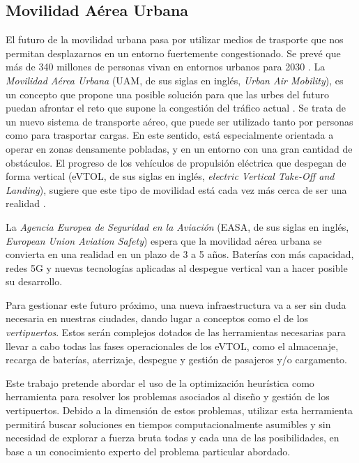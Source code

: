 \documentclass[12pt,a4paper]{book}
\begin{document}
\subsection{Movilidad Aérea Urbana} \label{Subsubsec: 1_2_1}
El futuro de la movilidad urbana pasa por utilizar medios de trasporte que nos permitan desplazarnos en un entorno fuertemente congestionado. Se prevé que más de 340 millones de personas vivan en entornos urbanos para 2030 \cite{easa_what_nodate}. La \textsl{Movilidad Aérea Urbana} (UAM, de sus siglas en inglés, \textsl{Urban Air Mobility}), es un concepto que propone una posible solución para que las urbes del futuro puedan afrontar el reto que supone la congestión del tráfico actual \cite{park_vertiport_2022}. Se trata de un nuevo sistema de transporte aéreo, que puede ser utilizado tanto por personas como para trasportar cargas. En este sentido, está especialmente orientada a operar en zonas densamente pobladas, y en un entorno con una gran cantidad de obstáculos. El progreso de los vehículos de propulsión eléctrica que despegan de forma vertical (eVTOL, de sus siglas en inglés, \textsl{electric Vertical Take-Off and Landing}), sugiere que este tipo de movilidad está cada vez más cerca de ser una realidad \cite{espejo-diaz_heuristic_2023}.  

La \textsl{Agencia Europea de Seguridad en la Aviación} (EASA, de sus siglas en inglés, \textsl{European Union Aviation Safety}) espera que la movilidad aérea urbana se convierta en una realidad en un plazo de 3 a 5 años. Baterías con más capacidad, redes 5G y nuevas tecnologías aplicadas al despegue vertical van a hacer posible su desarrollo.

Para gestionar este futuro próximo, una nueva infraestructura va a ser sin duda necesaria en nuestras ciudades, dando lugar a conceptos como el de los 
\textsl{vertipuertos}. Estos serán complejos dotados de las herramientas necesarias para llevar a cabo todas las fases operacionales de los eVTOL, como el almacenaje, recarga de baterías, aterrizaje, despegue y gestión de pasajeros y/o cargamento. 

Este trabajo pretende abordar el uso de la optimización heurística como herramienta para resolver los problemas asociados al diseño y gestión de los vertipuertos. Debido a la dimensión de estos problemas, utilizar esta herramienta permitirá buscar soluciones en tiempos computacionalmente asumibles y sin necesidad de explorar a fuerza bruta todas y cada una de las posibilidades, en base a un conocimiento experto del problema particular abordado.  
\end{document}
